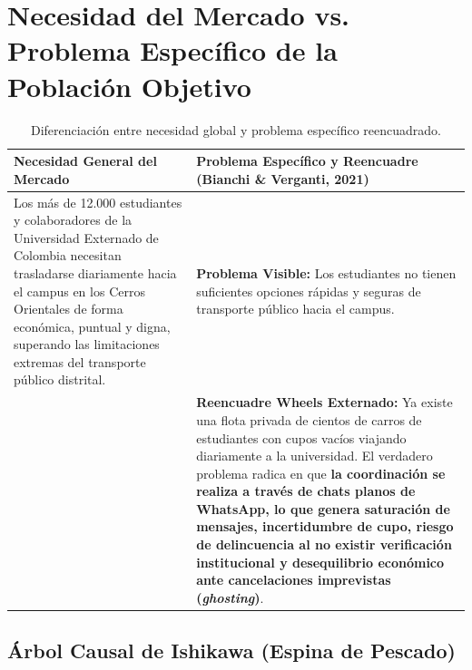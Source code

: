\documentclass[11pt,a4paper]{article}
\begin{document}
\section{Necesidad del Mercado vs. Problema Específico de la Población Objetivo}

\begin{table}[h!]
\centering
\small
\begin{tabularx}{\textwidth}{p{7cm} X}
\toprule
\textbf{Necesidad General del Mercado} & \textbf{Problema Específico y Reencuadre (Bianchi \& Verganti, 2021)} \\
\midrule
Los más de 12.000 estudiantes y colaboradores de la Universidad Externado de Colombia necesitan trasladarse diariamente hacia el campus en los Cerros Orientales de forma económica, puntual y digna, superando las limitaciones extremas del transporte público distrital. & 
\textbf{Problema Visible:} Los estudiantes no tienen suficientes opciones rápidas y seguras de transporte público hacia el campus.\\
& \textbf{Reencuadre Wheels Externado:} Ya existe una flota privada de cientos de carros de estudiantes con cupos vacíos viajando diariamente a la universidad. El verdadero problema radica en que \textbf{la coordinación se realiza a través de chats planos de WhatsApp, lo que genera saturación de mensajes, incertidumbre de cupo, riesgo de delincuencia al no existir verificación institucional y desequilibrio económico ante cancelaciones imprevistas (\textit{ghosting})}. \\
\bottomrule
\end{tabularx}
\caption{Diferenciación entre necesidad global y problema específico reencuadrado.}
\end{table}

\subsection{Árbol Causal de Ishikawa (Espina de Pescado)}
\end{document}
